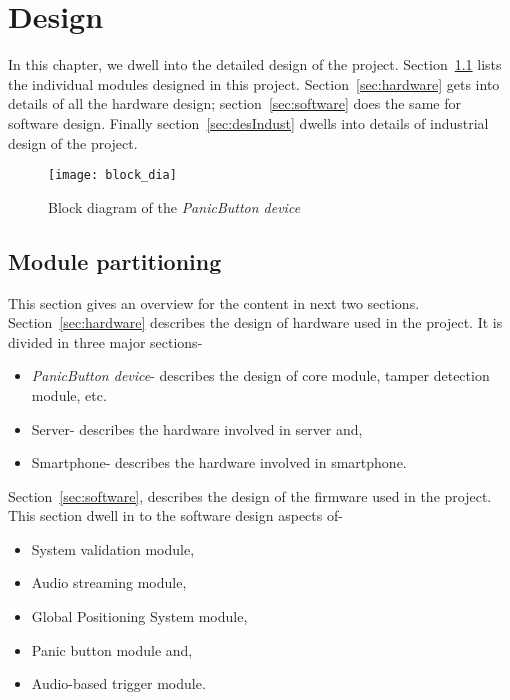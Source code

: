\chapter{Design}
In this chapter, we dwell into the detailed design of the project. Section~\ref{sec:module} lists the individual modules designed in this project. Section~\ref{sec:hardware} gets into details of all the hardware design; section~\ref{sec:software} does the same for software design. Finally section~\ref{sec:desIndust} dwells into details of industrial design of the project.
\begin{figure}[H]
\centering
\texttt{[image: block\_dia]}
\caption{Block diagram of the \emph{PanicButton device}}
\label{fig:block_dia}
\end{figure}


\section{Module partitioning}
\label{sec:module}
This section gives an overview for the content in next two sections. Section~\ref{sec:hardware} describes the design of hardware used in the project. It is divided in three major sections-
\begin{itemize}
\item \emph{PanicButton device}- describes the design of core module, tamper detection module, etc.
\item Server- describes the hardware involved in server and,
\item Smartphone- describes the hardware involved in smartphone.
\end{itemize}

Section~\ref{sec:software}, describes the design of the firmware used in the project. This section dwell in to the software design aspects of-
\begin{itemize}
\item System validation module,
\item Audio streaming module,
\item Global Positioning System module,
\item Panic button module and,
\item Audio-based trigger module.
\end{itemize}  
 
